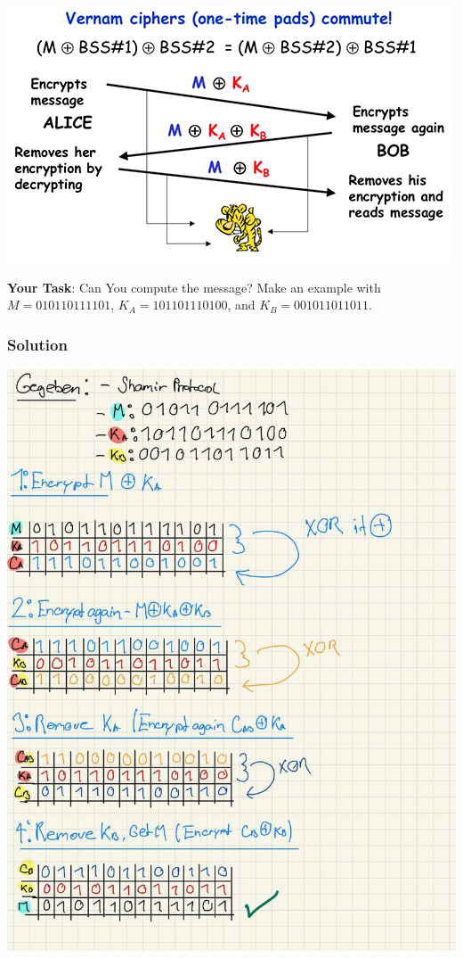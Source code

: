 \documentclass[11pt]{article}
\begin{document}
\begin{center}
	\includegraphics{img/VernamCiphers.png}
\end{center}


\textbf{Your Task}: Can You compute the message? Make an example with
\(M = 010110111101\), \(K_A = 101101110100\), and
\(K_B = 001011011011\).

\hypertarget{solution}{%
\subsubsection{Solution}\label{solution}}

\includegraphics{img/psol3.jpg}
\end{document}
